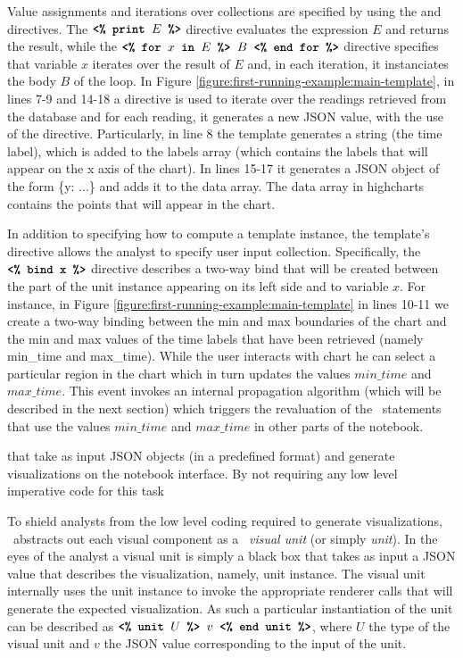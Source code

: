 { Value assignments and iterations over collections are specified by using the  and  directives. The $\texttt{\textbf{<\% print }} E \texttt{\textbf{ \%>}}$ directive evaluates the expression $E$ and returns the result, while the $\texttt{\textbf{<\% for }} x \texttt{\textbf{ in }} E \texttt{\textbf{ \%> }} B \texttt{\textbf{ <\% end for \%>}}$ directive specifies that variable $x$ iterates over the result of $E$ and, in each iteration, it instanciates the body $B$ of the  loop. In Figure \ref{figure:first-running-example:main-template}, in lines 7-9 and 14-18 a  directive is used to iterate over the readings retrieved from the database and for each reading, it generates a new JSON value, with the use of the  directive. Particularly, in line 8 the template generates a string (the time label), which is added to the labels array (which contains the labels that will appear on the x axis of the chart). In lines 15-17 it generates a JSON object of the form \{y: ...\} and adds it to the data array. The data array in highcharts contains the points that will appear in the chart.

 In addition to specifying how to compute a template instance, the template's  directive allows the analyst to specify user input collection. Specifically, the $\texttt{\textbf{<\% bind x}} \texttt{\textbf{ \%>}}$ directive describes a two-way bind that will be created between the part of the unit instance appearing on its left side and to variable $x$. For instance, in Figure \ref{figure:first-running-example:main-template} in lines 10-11 we create a two-way binding between the min and max boundaries of the chart and the min and max values of the time labels that have been retrieved (namely min\_time and max\_time). While the user interacts with chart he can select a particular region in the chart which in turn updates the values $min\_time$ and $max\_time$. This event invokes an internal propagation algorithm (which will be described in the next section) which triggers the revaluation of the \projname\ statements that use the values $min\_time$ and $max\_time$ in other parts of the notebook.



that take as input JSON objects (in a predefined format) and generate visualizations on the notebook interface. By not requiring any low level imperative code for this task 

\label{section:visual Units}

\noindent To shield analysts from the low level coding required to generate visualizations, \projname\ abstracts out each visual component as a \projname\ \emph{visual unit} (or simply \emph{unit}). In the eyes of the analyst a visual unit is simply a black box that takes as input a JSON value that describes the visualization, namely, unit instance. The visual unit internally uses the unit instance to invoke the appropriate renderer calls that will generate the expected visualization. As such a particular instantiation of the unit  can be described as $\texttt{\textbf{<\% unit }} U \texttt{\textbf{ \%> }} v \texttt{\textbf{ <\% end unit \%>}}$, where $U$ the type of the visual unit and $v$ the JSON value corresponding to the input of the unit. 


}
